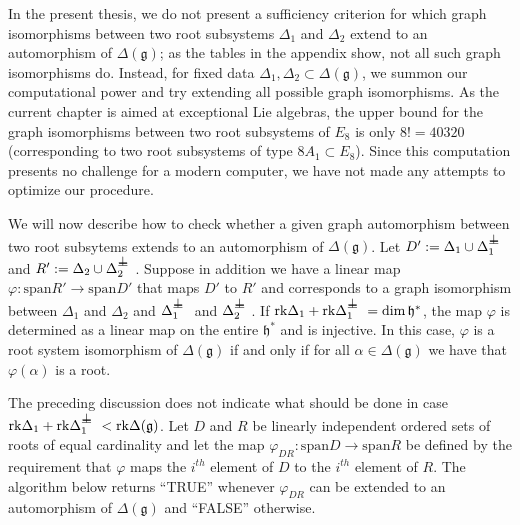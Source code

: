 \documentclass[12pt]{report}
\newcommand{\hh}{\mathfrak{h}}
\newcommand{\gG}{\mathfrak{g}}
\renewcommand {\phi} {\varphi}
\newcommand{\linspan}{\mathrm{span}}
\newcommand{\rk}{\mathrm{rk}}
\def\sperp{{\hbox{$\perp${\hbox{\kern -.77em $-$}\raise-1pt\hbox{\kern -.77em $-$}}\ }}}
\begin{document}
In the present thesis, we do not present a sufficiency criterion for which graph isomorphisms between two root subsystems $\Delta_1$ and $\Delta_2$ extend to an automorphism of $\Delta(\gG)$; as the tables in the appendix show, not all such graph isomorphisms do. Instead, for fixed data $\Delta_1, \Delta_2\subset\Delta(\gG)$, we summon our computational power and try extending all possible graph isomorphisms. As the current chapter is aimed at exceptional Lie algebras, the upper bound for the graph isomorphisms between two root subsystems of $E_8$ is only $8!=40320$ (corresponding to two root subsystems of type $8A_1\subset E_8$). Since this computation presents no challenge for a modern computer, we have not made any attempts to optimize our procedure.

We will now describe how to check whether a given graph automorphism between two root subsytems extends to an automorphism of $\Delta(\gG)$. Let $D':=\Delta_1\cup \Delta_1^\sperp $ and $R':=\Delta_2\cup \Delta_2^\sperp$. Suppose in addition we have a linear map $\phi:\linspan R'\to \linspan D'$ that maps $D'$ to $R'$ and corresponds to a graph isomorphism between $\Delta_1$ and $\Delta_2$ and  $\Delta_1^\sperp$ and $\Delta_2^\sperp$. If $\rk \Delta_1+\rk \Delta_1^\sperp=\dim \hh^*$, the map $\phi$ is determined as a linear map on the entire $\hh^*$ and is injective. In this case, $\phi$ is a root system isomorphism of $\Delta(\gG)$ if and only if for all $\alpha\in\Delta(\gG)$ we have that $\phi(\alpha)$ is a root. 

The preceding discussion does not indicate what should be done in case $\rk \Delta_1+\rk \Delta_1^\sperp<\rk\Delta(\gG)$. Let $D$ and $R$ be linearly independent ordered sets of roots of equal cardinality and let the map $\phi_{DR}:\linspan D\to \linspan R$ be defined by the requirement that $\phi$ maps the $i^{th}$ element of $D$ to the  $i^{th}$ element of $R$. The algorithm below returns ``TRUE'' whenever $\phi_{DR}$ can be extended to an automorphism of $\Delta(\gG)$ and ``FALSE'' otherwise. 
\end{document}
